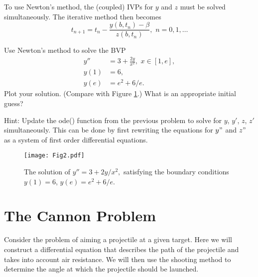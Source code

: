 To use Newton's method, the (coupled) IVPs for $y$ and $z$ must be solved simultaneously.
The iterative method then becomes
\[t_{n+1} = t_n - \frac{ y(b,t_n) - \beta}{z(b,t_n)}, \,\, n = 0,1,\hdots\]

\begin{problem}
Use Newton's method to solve the BVP
\begin{equation*}
\begin{split}
y'' &= 3 + \frac{2y}{x^2}, \,\, x \in [1,e],\\
y(1) &= 6, \\
y(e) &= e^2 + 6/e.
\end{split}
\end{equation*}
Plot your solution.
(Compare with Figure \ref{prob:shooting2}.)
What is an appropriate initial guess?

Hint: Update the ode() function from the previous problem to solve for $y$, $y'$, $z$, $z'$ simultaneously.
This can be done by first rewriting the equations for $y"$ and $z"$ as a system of first order differential equations.

\begin{figure}[H]
\texttt{[image: Fig2.pdf]}
\caption{The solution of  $y'' = 3 + 2y/x^2,$ satisfying the boundary conditions $y(1) = 6$, $ y(e) =  e^2 + 6/e$.}
\label{prob:shooting2}
\end{figure}
\end{problem}

\section*{The Cannon Problem}

Consider the problem of aiming a projectile at a given target.
Here we will construct a differential equation that describes the path of the projectile and takes into account air resistance.
We will then use the shooting method to determine the angle at which the projectile should be launched.

